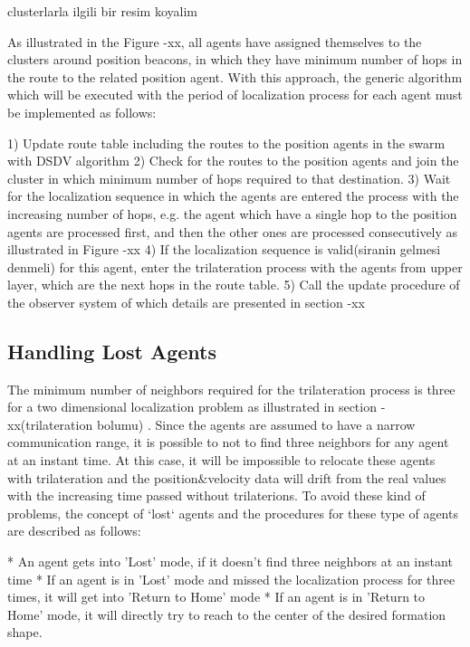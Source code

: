 \documentclass[twoside]{article}
\begin{document}
	clusterlarla ilgili bir resim koyalim
	
	As illustrated in the Figure -xx, all agents have assigned themselves to the clusters around position beacons, in which they have minimum number of hops in the route to the related position agent.  With this approach, the generic algorithm which will be executed with the period of localization process for each agent must be implemented as follows:
	
	1) Update route table including the routes to the position agents in the swarm with DSDV algorithm 
	2) Check for the routes to the position agents and join the cluster in which minimum number of hops required to that destination.
	3) Wait for the localization sequence in which the agents are entered the process with the increasing number of hops, e.g. the agent which have a single hop to the position agents are processed first, and then the other ones are processed consecutively as illustrated in Figure -xx
	4) If the localization sequence is valid(siranin gelmesi denmeli) for this agent, enter the trilateration process with the agents from upper layer,  which are the next hops in the route table.
	5) Call the update procedure of the observer system of which details are presented in section -xx
	
	\subsection{Handling Lost Agents}
	
	The minimum number of neighbors required for the trilateration process is three for a two dimensional localization problem as illustrated in section -xx(trilateration bolumu) . Since the agents are assumed to have a narrow communication range, it is possible to not to find three neighbors for any agent at an instant time. At this case, it will be impossible to relocate these agents with trilateration and the position$\&$velocity data will drift from the real values with the increasing time passed without trilaterions. To avoid these kind of problems, the concept of `lost` agents and the procedures for these type of agents are described as follows:
	
	* An agent gets into 'Lost' mode, if it doesn't find three neighbors at an instant time
	* If an agent is in 'Lost' mode and missed the localization process for three times, it will get into 'Return to Home' mode
	* If an agent is in 'Return to Home' mode, it will directly try to reach to the center of the desired formation shape.
	
\end{document}
